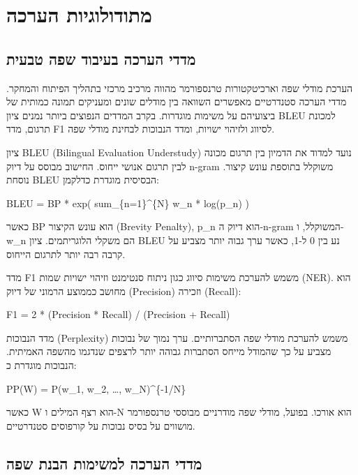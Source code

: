 \hypertarget{ux5deux5eaux5d5ux5d3ux5d5ux5dcux5d5ux5d2ux5d9ux5d5ux5ea-ux5d4ux5e2ux5e8ux5dbux5d4}{%
\section{מתודולוגיות
הערכה}\label{ux5deux5eaux5d5ux5d3ux5d5ux5dcux5d5ux5d2ux5d9ux5d5ux5ea-ux5d4ux5e2ux5e8ux5dbux5d4}}

\hypertarget{ux5deux5d3ux5d3ux5d9-ux5d4ux5e2ux5e8ux5dbux5d4-ux5d1ux5e2ux5d9ux5d1ux5d5ux5d3-ux5e9ux5e4ux5d4-ux5d8ux5d1ux5e2ux5d9ux5ea}{%
\subsection{מדדי הערכה בעיבוד שפה
טבעית}\label{ux5deux5d3ux5d3ux5d9-ux5d4ux5e2ux5e8ux5dbux5d4-ux5d1ux5e2ux5d9ux5d1ux5d5ux5d3-ux5e9ux5e4ux5d4-ux5d8ux5d1ux5e2ux5d9ux5ea}}

הערכת מודלי שפה וארכיטקטורות טרנספורמר מהווה מרכיב מרכזי בתהליך הפיתוח
והמחקר. מדדי הערכה סטנדרטיים מאפשרים השוואה בין מודלים שונים ומעניקים
תמונה כמותית של ביצועיהם על משימות מוגדרות. בקרב המדדים הנפוצים ביותר
נמנים ציון BLEU למכונת תרגום, מדד F1 לסיווג ולזיהוי ישויות, ומדד הנבוכות
לבחינת מודלי שפה.

ציון BLEU (Bilingual Evaluation Understudy) נועד למדוד את הדמיון בין
תרגום מכונה לבין תרגום אנושי ייחוס. החישוב מבוסס על דיוק n-gram משוקלל
בתוספת עונש קיצור. נוסחת BLEU הבסיסית מוגדרת כדלקמן:

BLEU = BP * exp( sum\_\{n=1\}\^{}\{N\} w\_n * log(p\_n) )

כאשר BP הוא עונש הקיצור (Brevity Penalty), p\_n הוא דיוק ה-n-gram
המשוקלל, ו-w\_n הם משקלי הלוגריתמים. ציון BLEU נע בין 0 ל-1, כאשר ערך
גבוה יותר מצביע על קרבה רבה יותר לתרגום הייחוס.

מדד F1 משמש להערכת משימות סיווג כגון ניתוח סנטימנט וזיהוי ישויות שמות
(NER). הוא מחושב כממוצע הרמוני של דיוק (Precision) וזכירה (Recall):

F1 = 2 * (Precision * Recall) / (Precision + Recall)

מדד הנבוכות (Perplexity) משמש להערכת מודלי שפה הסתברותיים. ערך נמוך של
נבוכות מצביע על כך שהמודל מייחס הסתברות גבוהה יותר לרצפים שנדגמו מהשפה
האמיתית. הנבוכות מוגדרת כ:

PP(W) = P(w\_1, w\_2, \ldots, w\_N)\^{}\{-1/N\}

כאשר W הוא רצף המילים ו-N הוא אורכו. בפועל, מודלי שפה מודרניים מבוססי
טרנספורמר מושווים על בסיס נבוכות על קורפוסים סטנדרטיים.

\hypertarget{ux5deux5d3ux5d3ux5d9-ux5d4ux5e2ux5e8ux5dbux5d4-ux5dcux5deux5e9ux5d9ux5deux5d5ux5ea-ux5d4ux5d1ux5e0ux5ea-ux5e9ux5e4ux5d4}{%
\subsection{מדדי הערכה למשימות הבנת
שפה}\label{ux5deux5d3ux5d3ux5d9-ux5d4ux5e2ux5e8ux5dbux5d4-ux5dcux5deux5e9ux5d9ux5deux5d5ux5ea-ux5d4ux5d1ux5e0ux5ea-ux5e9ux5e4ux5d4}}

